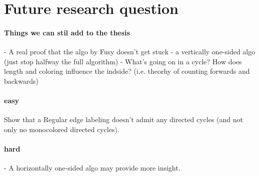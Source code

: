 \section{Future research question}

\paragraph{Things we can stil add to the thesis}
- A real proof that the algo by Fusy doesn't get stuck
- a vertically one-sided algo (just stop halfway the full algorithm)
- What's going on in a cycle? How does length and coloring influence the indside? (i.e. theorhy of counting forwards and backwards)

\paragraph{easy}
Show that a Regular edge labeling doesn't admit any directed cycles (and not only no monocolored directed cycles).

\paragraph{hard}
- A horizontally one-sided algo may provide more insight.
